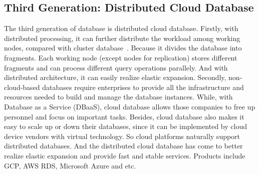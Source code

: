 \subsection{Third Generation: Distributed Cloud Database}
The third generation of database is distributed cloud database. Firstly, with distributed processing, it can further distribute the workload among working nodes, compared with cluster database~\cite{DBLP:journals/jidm/FigueiredoBM10}. Because it divides the database into fragments. Each working node (except nodes for replication) stores different fragments and can process different query  operations parallely. And with distributed architecture, it can easily realize elastic expansion. Secondly, non-cloud-based databases require enterprises to provide all the infrastructure and resources needed to build and manage the database instances. While, with Database as a Service (DBaaS), cloud database allows those companies to free up personnel and focus on important tasks.
Besides, cloud database also makes it easy to scale up or down their databases, since it can be implemented by cloud device vendors with virtual technology. 
So cloud platforms naturally support distributed databases. 
And the distributed cloud database has come to better realize elastic expansion and provide fast and stable services. Products include GCP, AWS RDS, Microsoft Azure and etc.

